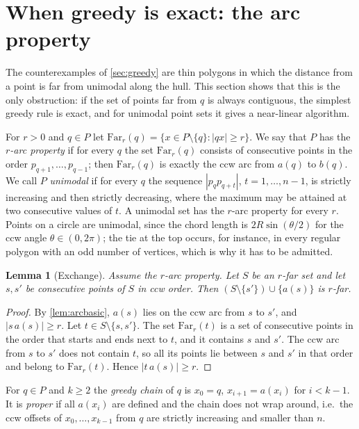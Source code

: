 \documentclass[11pt,a4paper]{article}
\newtheorem{lemma}[theorem]{Lemma}
\theoremstyle{definition}
\theoremstyle{remark}
\begin{document}
\section{When greedy is exact: the arc property}\label{sec:arc}

The counterexamples of \cref{sec:greedy} are thin polygons in which the
distance from a point is far from unimodal along the hull. This section shows
that this is the only obstruction: if the set of points far from $q$ is always
contiguous, the simplest greedy rule is exact, and for unimodal point sets it
gives a near-linear algorithm.

For $r>0$ and $q\in P$ let $\mathrm{Far}_r(q)=\{x\in P\setminus\{q\}:|qx|\ge r\}$.
We say that $P$ has the \emph{$r$-arc property} if for every $q$ the set
$\mathrm{Far}_r(q)$ consists of consecutive points in the order
$p_{q+1},\dots,p_{q-1}$; then $\mathrm{Far}_r(q)$ is exactly the ccw arc from
$a(q)$ to $b(q)$. We call $P$ \emph{unimodal} if for every $q$ the sequence
$|p_qp_{q+t}|$, $t=1,\dots,n-1$, is strictly increasing and then strictly
decreasing, where the maximum may be attained at two consecutive values of
$t$. A unimodal set has the $r$-arc property for every $r$. Points on a circle
are unimodal, since the chord length is $2R\sin(\theta/2)$ for the ccw angle
$\theta\in(0,2\pi)$; the tie at the top occurs, for instance, in every regular
polygon with an odd number of vertices, which is why it has to be admitted.

\begin{lemma}[Exchange]\label{lem:a1}
Assume the $r$-arc property. Let $S$ be an $r$-far set and let $s,s'$ be
consecutive points of $S$ in ccw order. Then $(S\setminus\{s'\})\cup\{a(s)\}$
is $r$-far.
\end{lemma}
\begin{proof}
By \cref{lem:arcbasic}, $a(s)$ lies on the ccw arc from $s$ to $s'$, and
$|s\,a(s)|\ge r$. Let $t\in S\setminus\{s,s'\}$. The set $\mathrm{Far}_r(t)$
is a set of consecutive points in the order that starts and ends next to $t$,
and it contains $s$ and $s'$. The ccw arc from $s$ to $s'$ does not contain
$t$, so all its points lie between $s$ and $s'$ in that order and belong to
$\mathrm{Far}_r(t)$. Hence $|t\,a(s)|\ge r$.
\end{proof}

For $q\in P$ and $k\ge2$ the \emph{greedy chain} of $q$ is $x_0=q$,
$x_{i+1}=a(x_i)$ for $i<k-1$. It is \emph{proper} if all $a(x_i)$ are defined
and the chain does not wrap around, i.e.\ the ccw offsets of $x_0,\dots,x_{k-1}$
from $q$ are strictly increasing and smaller than $n$.
\end{document}

